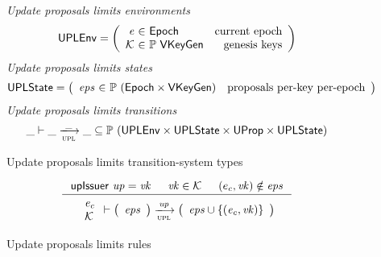 \clearpage

\begin{figure}[htb]
  \emph{Update proposals limits  environments}
    \begin{equation*}
    \UPLEnv =
    \left(
      \begin{array}{r@{~\in~}lr}
        \var{e} & \Epoch & \text{current epoch}\\
        \mathcal{K} & \powerset{\VKeyGen} & \text{genesis keys}\\
      \end{array}
    \right)
  \end{equation*}
  \emph{Update proposals limits states}
  \begin{equation*}
    \UPLState
    = \left(
      \begin{array}{r@{~\in~}lr}
        \var{eps} & \powerset{(\Epoch \times \VKeyGen)} & \text{proposals per-key per-epoch}\\
      \end{array}
    \right)
  \end{equation*}
  \emph{Update proposals limits transitions}
  \begin{equation*}
    \var{\_} \vdash
    \var{\_} \trans{upl}{\_} \var{\_}
    \subseteq \powerset (\UPLEnv \times \UPLState \times \UProp \times \UPLState)
  \end{equation*}
  \caption{Update proposals limits transition-system types}
  \label{fig:ts-types:up-limits}
\end{figure}

\begin{figure}[htb]
  \begin{equation}
    \label{eq:rule:up-limits}
    \inference
    {\upIssuer{up} = \var{vk}
      & \var{vk} \in \mathcal{K}
      & (e_c, \var{vk}) \notin \var{eps}
    }
    {
      {\begin{array}{l}
         \var{e_c}\\
         \mathcal{K}
       \end{array}
      }
      \vdash
      {
        \left(
          \begin{array}{l}
            \var{eps}
          \end{array}
        \right)
      }
      \trans{upl}{\var{up}}
      {
        \left(
          \begin{array}{l}
            \var{eps \cup \{(e_c, \var{vk})\}}
          \end{array}
        \right)
      }
    }
  \end{equation}
  \caption{Update proposals limits rules}
  \label{fig:rules:up-limits}
\end{figure}

